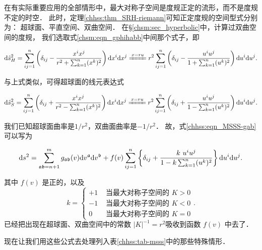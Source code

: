 在有实际重要应用的全部情形中，最大对称子空间是度规正定的流形，而不是度规不定的时空．
此时，定理\ref{chhss:thm_SRH-riemann}可知正定度规的空间型式分别为：
超球面、平直空间、双曲空间．
在\S\ref{chsm:sec_hyperbolic}中，计算过双曲空间的度规，
我们选取式\eqref{chsm:eqn_gphihabb}中间那个式子，即
\begin{small}
\setlength{\mathindent}{0em}
\begin{align*}
    {\rm d}\hat{s}^2_H= \sum_{ij=1}^{n}\left(\delta_{ij}-\frac{x^i x^j}{r^2+\sum_{k=1}^{n}(x^k)^2}\right) {\rm d} x^i {\rm d} x^j 
    \xlongequal{x=ru} r^2 \sum_{ij=1}^{n}\left(\delta_{ij}-\frac{ u^i u^j}{1+\sum_{k=1}^{n}(u^k)^2}\right)  {\rm d} u^i {\rm d} u^j .
\end{align*}\setlength{\mathindent}{2em}
\end{small}
与上式类似，可得超球面的线元表达式
\begin{small}
    \setlength{\mathindent}{0em}
\begin{align*}
    {\rm d}\hat{s}^2_S= \sum_{ij=1}^{n}\left(\delta_{ij}+\frac{x^i x^j}{r^2-\sum_{k=1}^{n}(x^k)^2}\right) {\rm d} x^i {\rm d} x^j 
    \xlongequal{x=ru} r^2 \sum_{ij=1}^{n}\left(\delta_{ij}+\frac{ u^i u^j}{1-\sum_{k=1}^{n}(u^k)^2}\right)  {\rm d} u^i {\rm d} u^j .
\end{align*} \setlength{\mathindent}{2em}
\end{small}
我们已知超球面曲率是$1/r^2$，双曲面曲率是$-1/r^2$．
故，式\eqref{chhss:eqn_MSSS-gab}可以写为
\begin{small}
\begin{equation}\label{chhss:eqn_pg-mss}
    \mathrm{d} s^2=\sum_{\mathfrak{ab}=n+1}^{m} 
    g_{\mathfrak{ab}}(v) {\rm d} v^{\mathfrak{a}} {\rm d} v^{\mathfrak{b}}
    +f(v) \sum_{ij=1}^{n} \left\{\delta_{ij} + \frac{k \ u^i u^j}{1-k \sum_{k=1}^{n}(u^k)^2}\right\} 
    {\rm d} u^i {\rm d} u^j.
\end{equation}
\end{small}
其中 $f(v)$ 是正的，以及
\begin{equation}
    k= \begin{cases}
        +1 & \text { 当最大对称子空间的 } K>0 \\ 
        -1 & \text { 当最大对称子空间的 } K<0 \\ 
        0  & \text { 当最大对称子空间的 } K=0
        \end{cases} .
\end{equation}
已经把出现在超球面、双曲空间中的常数 $|K|^{-1}=r^2$吸收到函数 $f(v)$ 中去了．

现在让我们用这些公式去处理列入表\ref{chhss:tab-msss}中的那些特殊情形．


